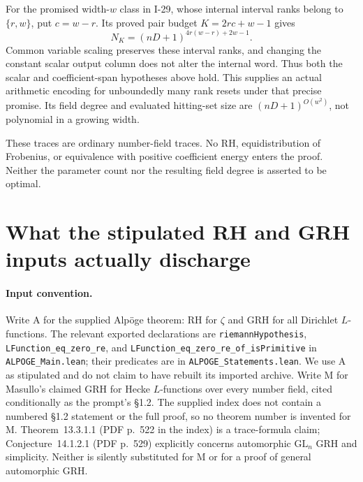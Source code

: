 \documentclass[11pt,a4paper]{article}
\theoremstyle{definition}\newtheorem{definition}{Definition}
\begin{document}
For the promised width-$w$ class in I-29, whose internal interval
ranks belong to $\{r,w\}$, put $c=w-r$. Its proved pair budget
$K=2rc+w-1$ gives
\[
 N_K=(nD+1)^{4r(w-r)+2w-1}.
\]
Common variable scaling preserves these interval ranks, and
changing the constant scalar output column does not alter the
internal word. Thus both the scalar and coefficient-span
hypotheses above hold. This supplies an actual arithmetic
encoding for unboundedly many rank resets under that precise
promise. Its field degree and evaluated hitting-set size are
$(nD+1)^{O(w^2)}$, not polynomial in a growing width.

These traces are ordinary number-field traces. No RH,
equidistribution of Frobenius, or equivalence with positive coefficient
energy enters the proof. Neither the parameter count nor
the resulting field degree is asserted to be optimal.



\section{What the stipulated RH and GRH inputs actually discharge}

\paragraph{Input convention.}
Write A for the supplied Alp\"oge theorem: RH for $\zeta$ and GRH for all Dirichlet $L$-functions. The relevant exported declarations are \nolinkurl{riemannHypothesis}, \nolinkurl{LFunction_eq_zero_re}, and \nolinkurl{LFunction_eq_zero_re_of_isPrimitive} in \nolinkurl{ALPOGE_Main.lean}; their predicates are in \nolinkurl{ALPOGE_Statements.lean}. We use A as stipulated and do not claim to have rebuilt its imported archive. Write M for Masullo's claimed GRH for Hecke $L$-functions over every number field, cited conditionally as the prompt's \S1.2. The supplied index does not contain a numbered \S1.2 statement or the full proof, so no theorem number is invented for M. Theorem~13.3.1.1 (PDF p.~522 in the index) is a trace-formula claim; Conjecture~14.1.2.1 (PDF p.~529) explicitly concerns automorphic $\mathrm{GL}_n$ GRH and simplicity. Neither is silently substituted for M or for a proof of general automorphic GRH.
\end{document}
